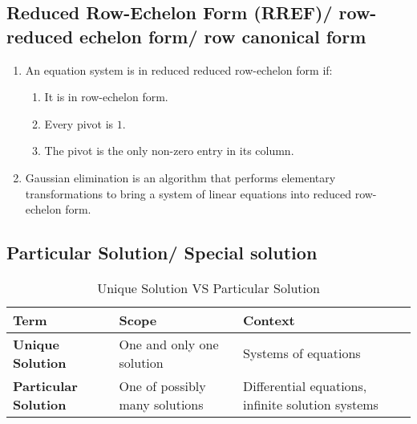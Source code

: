 \subsection{Reduced Row-Echelon Form (RREF)/ row-reduced echelon form/ row canonical form \cite{mfml/book/mml/Deisenroth-Faisal-Ong}}

\begin{enumerate}
    \item An equation system is in reduced reduced row-echelon form if:
    \begin{enumerate}
        \item It is in row-echelon form.
        \hfill \cite{mfml/book/mml/Deisenroth-Faisal-Ong}

        \item Every pivot is $1$.
        \hfill \cite{mfml/book/mml/Deisenroth-Faisal-Ong}

        \item The pivot is the only non-zero entry in its column.
        \hfill \cite{mfml/book/mml/Deisenroth-Faisal-Ong}
    \end{enumerate}

    \item Gaussian elimination is an algorithm that performs elementary transformations to bring a system of linear equations into reduced row-echelon form.
    \hfill \cite{mfml/book/mml/Deisenroth-Faisal-Ong}
\end{enumerate}



\subsection{Particular Solution/ Special solution}

\begin{customArrayStretch}{1.3}
\begin{table}[H]
    \centering
    \begin{tabular}{|l|l|l|}
        \hline
        \textbf{Term} &
            \textbf{Scope} &
            \textbf{Context} \\ \hline \hline

        \textbf{Unique Solution} &
            One and only one solution &
            Systems of equations \\ \hline

        \textbf{Particular Solution} &
            One of possibly many solutions &
            Differential equations, infinite solution systems \\ \hline

    \end{tabular}
    \caption*{Unique Solution VS Particular Solution \cite{common/online/chatgpt}}
\end{table}
\end{customArrayStretch}


